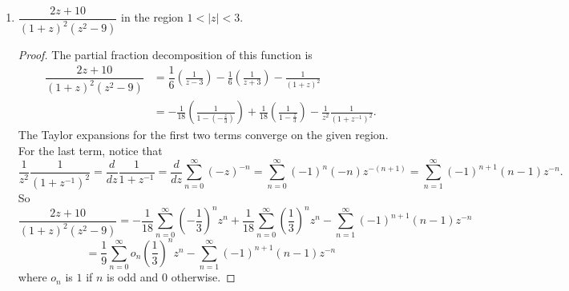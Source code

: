 \documentclass[10pt]{article}
\begin{document}
\begin{enumerate}
\begin{enumerate}
\begin{proof}
When $0 < |z| < 1$,
$$
\frac{1}{z^2(1-z)} = z^{-2}\sum_{n=0}^\infty z^n = \sum_{n=-2}^\infty z^n.
$$
When $|z| > 1$,
$$
\frac{1}{z^2(1-z)} = -z^{-2}\frac{1}{z}\frac{1}{1-z^{-1}} = -z^{-3} \sum_{n=0}^\infty z^{-n} = \sum_{n=3}^\infty -z^{-n}.
$$
For the last region, we again make the substitution $w = 1-z$.  Notice that
$$
\frac{1}{(1-w)^2} = \frac{d}{dw} \frac{1}{1-w} = \frac{d}{dw} \sum_{n=0}^\infty w^n = \sum_{n=0}^\infty \frac{d}{dw} w^n = \sum_{n=0}^\infty n w^{n-1} = \sum_{n=1}^\infty n w^{n-1} = \sum_{n=0}^\infty (n+1) w^{n}.
$$
This means that
$$
\frac{1}{z^2(1-z)} = \frac{1}{(1-w)^2 w} = w^{-1}\sum_{n=0}^\infty (n+1) w^{n} = \sum_{n=0}^\infty (n+1) w^{n-1} = \sum_{n=-1}^\infty (n+2) w^{n} = \sum_{n=-1}^\infty (n+2) (1-z)^{n}
$$
$$
= \sum_{n=-1}^\infty (n+2)(-1)^n (z-1)^{n}.
$$
Thus,
$$
\dfrac{1}{z^2(1-z)}
=
\begin{cases}
\sum\limits_{n=-2}^\infty z^n & 0 < |z| < 1 \\
\sum\limits_{n=3}^\infty -z^{-n} & |z| > 1 \\
\sum\limits_{n=-1}^\infty (n+2)(-1)^n (z-1)^{n} & 0 < |z-1| < 1
\end{cases}
$$
\end{proof}

\item $\dfrac{2z + 10}{(1+z)^2 (z^2 - 9)}$ in the region $1 < |z| < 3$.
\begin{proof}
The partial fraction decomposition of this function is
\begin{align*}
\dfrac{2z + 10}{(1+z)^2 (z^2 - 9)} &= \dfrac{1}{6}\left(\frac{1}{z-3}\right) - \frac{1}{6}\left(\frac{1}{z+3}\right) - \frac{1}{(1+z)^2}
\\
&= -\frac{1}{18} \left(\frac{1}{1 - (-\frac{z}{3})}\right) + \frac{1}{18}\left(\frac{1}{1-\frac{z}{3}}\right) - \frac{1}{z^2}\frac{1}{(1+z^{-1})^2}.
\end{align*}
The Taylor expansions for the first two terms converge on the given region.  For the last term, notice that
$$
\frac{1}{z^2}\frac{1}{(1+z^{-1})^2} = \frac{d}{dz} \frac{1}{1+z^{-1}} = \frac{d}{dz} \sum_{n=0}^\infty (-z)^{-n} = \sum_{n=0}^\infty (-1)^n (-n)z^{-(n+1)} = \sum_{n=1}^\infty (-1)^{n+1} (n-1)z^{-n}.
$$
So
$$
\dfrac{2z + 10}{(1+z)^2 (z^2 - 9)} = -\frac{1}{18} \sum_{n=0}^\infty \left(-\frac{1}{3}\right)^n z^n + \frac{1}{18} \sum_{n=0}^\infty \left(\frac{1}{3}\right)^n z^n - \sum_{n=1}^\infty (-1)^{n+1} (n-1)z^{-n}
$$
$$
= \frac{1}{9} \sum_{n=0}^\infty o_n\left(\frac{1}{3}\right)^n z^n - \sum_{n=1}^\infty (-1)^{n+1} (n-1)z^{-n}
$$
where $o_n$ is $1$ if $n$ is odd and $0$ otherwise.
\end{proof}
\end{enumerate}


\end{enumerate}
\end{document}
